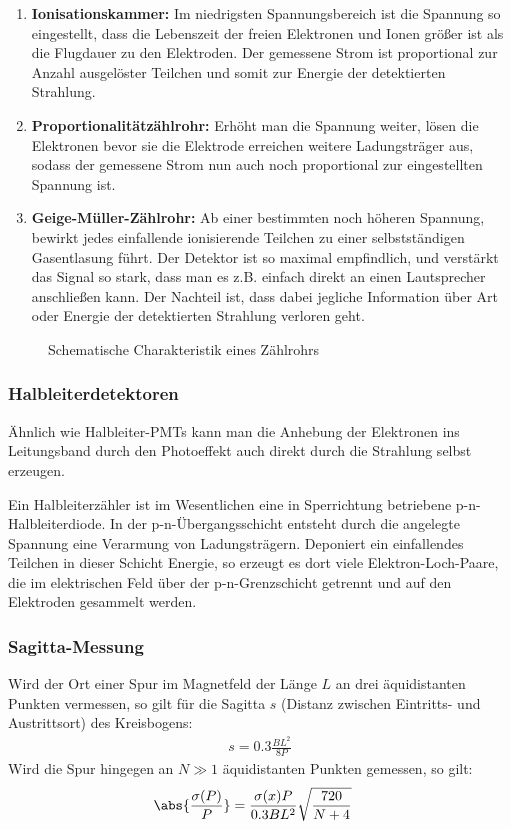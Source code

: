\documentclass[final]{summery_5.0}
\begin{document}
\begin{enumerate}
    \item {\bf Ionisationskammer:} Im niedrigsten Spannungsbereich ist die Spannung so eingestellt, dass die Lebenszeit der freien Elektronen und Ionen größer ist als die Flugdauer zu den Elektroden. Der gemessene Strom ist proportional zur Anzahl ausgelöster Teilchen und somit zur Energie der detektierten Strahlung.
    \item {\bf Proportionalitätzählrohr:} Erhöht man die Spannung weiter, lösen die Elektronen bevor sie die Elektrode erreichen weitere Ladungsträger aus, sodass der gemessene Strom nun auch noch proportional zur eingestellten Spannung ist.
    \item {\bf Geige-Müller-Zählrohr:} Ab einer bestimmten noch höheren Spannung, bewirkt jedes einfallende ionisierende Teilchen zu einer selbstständigen Gasentlasung führt. Der Detektor ist so maximal empfindlich, und verstärkt das Signal so stark, dass man es z.B. einfach direkt an einen Lautsprecher anschließen kann. Der Nachteil ist, dass dabei jegliche Information über Art oder Energie der detektierten Strahlung verloren geht. 
\end{enumerate}

\begin{figure}[H]
    \centering
    
    \caption{Schematische Charakteristik eines Zählrohrs}
\end{figure}

\subsubsection{Halbleiterdetektoren}
Ähnlich wie Halbleiter-PMTs kann man die Anhebung der Elektronen ins Leitungsband durch den Photoeffekt auch direkt durch die Strahlung selbst
erzeugen.

Ein Halbleiterzähler ist im Wesentlichen eine in
Sperrichtung betriebene p-n-Halbleiterdiode. In der p-n-Übergangsschicht entsteht durch die angelegte Spannung eine Verarmung von
Ladungsträgern. Deponiert ein einfallendes Teilchen in dieser Schicht
Energie, so erzeugt es dort viele Elektron-Loch-Paare, die im elektrischen Feld über der p-n-Grenzschicht getrennt und auf den Elektroden gesammelt werden.

\subsubsection{Sagitta-Messung}
Wird der Ort einer Spur im Magnetfeld der Länge $L$ an drei äquidistanten Punkten vermessen, so gilt für die Sagitta $s$ (Distanz zwischen Eintritts- und Austrittsort) des Kreisbogens:
\begin{align*}
    s = 0.3 \frac{BL^2}{8P}
\end{align*}
Wird die Spur hingegen an $N\gg1$ äquidistanten Punkten gemessen, so gilt:
\begin{align*}
    \abs{\frac{\sigma(P)}P} &= \frac{\sigma(x)P}{0.3 BL^2}\sqrt{\frac{720}{N+4}}
\end{align*}
\end{document}
